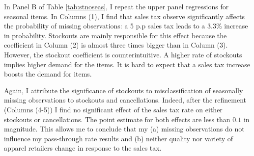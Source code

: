 \documentclass[12pt]{article}
\begin{document}
\begin{comment}
		\begin{tablenotes}[para,flushleft]
			\small \emph{Notes:} Robust standard errors clustered at state level are in parentheses. Dependent variables are dummies that equal 100 if an item is missing, temporarily out of stock (stockout) or permanently out of stock (cancellation). Column (1) includes data for both stockouts and cancellations. Columns (2,4) contain only observations with stockouts, whereas Columns (3,5) -- with cancellations. The number of observations in Columns (4-5) is smaller because I apply the \citet{matsa} refinement for dependent variables. For both stockouts and cancellations, I drop all out-of-season observations. In addition, for stockouts I consider only observations in between first and last valid price observation. I only keep in the sample cancellations that occur after valid price observations. Each regression includes item and month-year fixed effects and controls for seasonality. The first-stage F-statistic for the sales tax rate instrument is substantially higher than 20 in all the regressions. In all regressions, I exclude items ever priced above \$1,000.
		\end{tablenotes}
	\end{threeparttable}
	\end{table}
\end{comment}		
	In Panel B of Table \ref{tab:stnoseas}, I repeat the upper panel regressions for seasonal items. In Columns (1), I find that sales tax  observe significantly affects the probability of missing observations: a 5 p.p sales tax leads to a 3.3\% increase in probability. Stockouts are mainly responsible for this effect because the coefficient in Column (2) is almost three times bigger than in Column (3). 	
	However, the stockout coefficient is counterintuitive. A higher rate of stockouts implies higher demand for the items. It is hard to expect that a sales tax increase boosts the demand for items. 
	
	Again, I attribute the significance of stockouts to misclassification of seasonally missing observations to stockouts and cancellations. Indeed, after the refinement (Columns (4-5)) I find no significant effect of the sales tax rate on either stockouts or cancellations. The point estimate for both effects are less than $0.1$ in magnitude. This allows me to conclude that my (a) missing observations do not influence my pass-through rate results and (b) neither quality nor variety of apparel retailers change in response to the sales tax.
	
\end{document}

